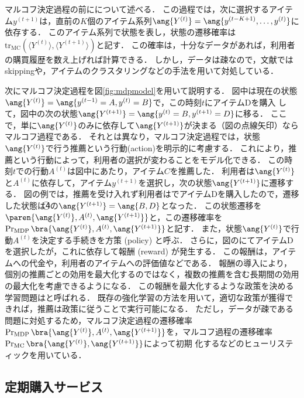 マルコフ決定過程の前にについて述べる．
この過程では，次に選択するアイテム$y^{(t+1)}$は，直前の$K$個のアイテム系列$\ang{Y^{(t)}}=\ang{y^{(t-K+1)},\dotsc,y^{(t)}}$に依存する．
このアイテム系列で状態を表し，状態の遷移確率は$\mathrm{tr}_\mathrm{MC}(\langle Y^{(t)}\rangle,\langle Y^{(t+1)}\rangle)$と記す．
この確率は，十分なデータがあれば，利用者の購買履歴を数え上げれば計算できる．
しかし，データは疎なので，文献\cite{uai:02:02,jmlr:05:03}ではskippingや，アイテムのクラスタリングなどの手法を用いて対処している．

次にマルコフ決定過程を図\ref{fig:mdpmodel}を用いて説明する．
図中は現在の状態$\ang{Y^{(t)}}=\ang{y^{(t-1)}=A,y^{(t)}=B}$で，この時刻$t$にアイテムDを購入
して，図中の次の状態$\ang{Y^{(t+1)}}=\ang{y^{(t)}=B,y^{(t+1)}=D}$に移る．
ここで，単に$\ang{Y^{(t)}}$のみに依存して$\ang{Y^{(t+1)}}$が決まる（図の点線矢印）ならマルコフ過程である．
それとは異なり，マルコフ決定過程では，状態$\ang{Y^{(t)}}$で行う推薦という行動(action)を明示的に考慮する．
これにより，推薦という行動によって，利用者の選択が変わることをモデル化できる．
この時刻$t$での行動$A^{(t)}$は図中にあたり，アイテム$C$を推薦した．
利用者は$\ang{Y^{(t)}}$と$A^{(t)}$に依存して，アイテム$y^{(t+1)}$を選択し，次の状態$\ang{Y^{(t+1)}}$に遷移する．
図の例では，推薦を受け入れず利用者はでアイテムDを購入したので，遷移した状態は\textcircled{\small 4}の$\ang{Y^{(t+1)}}=\ang{B,D}$となった．
この状態遷移を$\paren{\ang{Y^{(t)}},A^{(t)},\ang{Y^{(t+1)}}}$と，この遷移確率を$\Pr_\mathrm{MDP}\bra{\ang{Y^{(t)}},A^{(t)},\ang{Y^{(t+1)}}}$と記す．
また，状態$\ang{Y^{(t)}}$で行動$A^{(t)}$を決定する手続きを方策 (policy) と呼ぶ．
さらに，図のにてアイテムDを選択したが，これに依存して報酬 (reward) が発生する．
この報酬は，アイテムへの代金や，利用者のアイテムへの評価値などである．
報酬の導入により，個別の推薦ごとの効用を最大化するのではなく，複数の推薦を含む長期間の効用の最大化を考慮できるようになる．
この報酬を最大化するような政策を決める学習問題は\cite{eb:058:00,jb:019:00}と呼ばれる．
既存の強化学習の方法を用いて，適切な政策が獲得できれば，推薦は政策に従うことで実行可能になる．
ただし，データが疎である問題に対処するため，マルコフ決定過程の遷移確率$\Pr_\mathrm{MDP}\bra{\ang{Y^{(t)}}, A^{(t)},\ang{Y^{(t+1)}}}$を，マルコフ過程の遷移確率$\Pr_\mathrm{MC}\bra{\ang{Y^{(t)}}, \ang{Y^{(t+1)}}}$によって初期
化するなどのヒューリスティックを用いている．

\subsection{定期購入サービス}

